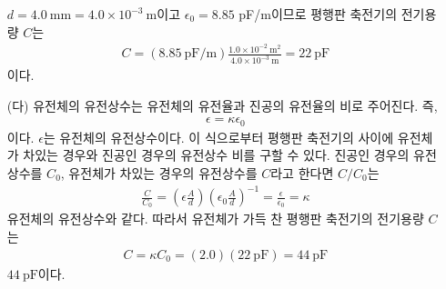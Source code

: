 \documentclass[tightenlines,floatfix,nofootinbib,superscriptaddress,fleqn]{revtex4-2}
\begin{document}
\begin{itemize}
  $d = 4.0~\mathrm{mm}=4.0 \times 10^{-3}~\mathrm{m}$이고 $\epsilon_0=8.85$ pF/m이므로
  평행판 축전기의 전기용량 $C$는
  \begin{align}
    C = (8.85~\mathrm{pF/m})\frac{1.0\times 10^{-2}~\mathrm{m^2}}
    {4.0 \times 10^{-3}~\mathrm{m}}
    =22~\mathrm{pF}
  \end{align}
  이다.
  \item[(다)] 유전체의 유전상수는 유전체의 유전율과 진공의 유전율의 비로 주어진다. 즉,
  \begin{align}
    \epsilon = \kappa\epsilon_0
  \end{align}
  이다. $\epsilon$는 유전체의 유전상수이다. 이 식으로부터 평행판 축전기의 사이에 유전체가
  차있는 경우와 진공인 경우의 유전상수 비를 구할 수 있다. 진공인 경우의 유전상수를 $C_0$,
  유전체가 차있는 경우의 유전상수를 $C$라고 한다면 $C/C_0$는
  \begin{align}
    \frac{C}{C_0}=\left(\epsilon\frac{A}{d}\right)
    \left(\epsilon_0\frac{A}{d}\right)^{-1}
    =\frac{\epsilon}{\epsilon_0}=\kappa
  \end{align}
  유전체의 유전상수와 같다. 따라서 유전체가 가득 찬 평행판 축전기의 전기용량 $C$는
  \begin{align}
    C = \kappa C_0 = (2.0)(22~\mathrm{pF})=44~\mathrm{pF}
  \end{align}
  $44~\mathrm{pF}$이다.


\end{itemize}
\end{document}
